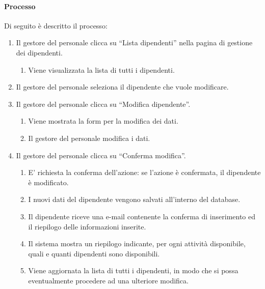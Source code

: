 \paragraph{Processo}
Di seguito è descritto il processo:
\begin{enumerate}
	\item Il gestore del personale clicca su “Lista dipendenti” nella pagina di gestione dei dipendenti.
		\begin{enumerate}
			\item Viene visualizzata la lista di tutti i dipendenti.
		\end{enumerate}
	\item Il gestore del personale seleziona il dipendente che vuole modificare.	
	\item Il gestore del personale clicca su “Modifica dipendente”. 
		\begin{enumerate}
			\item Viene mostrata la form per la modifica dei dati.
			\item Il gestore del personale modifica i dati.
		\end{enumerate}
	\item Il gestore del personale clicca su “Conferma modifica”.
		\begin{enumerate}
			\item E' richiesta la conferma dell’azione: se l’azione è confermata, il dipendente è modificato.
			\item I nuovi dati del dipendente vengono salvati all’interno del database.
			\item Il dipendente riceve una e-mail contenente la conferma di inserimento ed il riepilogo delle informazioni inserite.
			\item Il sistema mostra un riepilogo indicante, per ogni attività disponibile, quali e quanti dipendenti sono disponibili.
			\item Viene aggiornata la lista di tutti i dipendenti, in modo che si possa eventualmente procedere ad una ulteriore modifica.
		\end{enumerate}
\end{enumerate}
